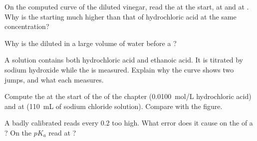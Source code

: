 \begin{exercise}[$\star\star$]\label{exo:g12:ph-conductivity-titrations:10}
On the computed curve of the diluted vinegar, read the  at the start,
at  and at . Why is the starting  much
higher than that of hydrochloric acid at the same concentration?
\end{exercise}

\begin{exercise}[$\star\star$]\label{exo:g12:ph-conductivity-titrations:11}
Why is the  diluted in a large volume of water before a
?
\end{exercise}

\begin{exercise}[$\star\star\star$]\label{exo:g12:ph-conductivity-titrations:12}
A solution contains both hydrochloric acid and ethanoic acid. It is
titrated by sodium hydroxide while the  is measured. Explain why the
curve shows two jumps, and what each  measures.
\end{exercise}

\begin{exercise}[$\star\star\star$]\label{exo:g12:ph-conductivity-titrations:13}
Compute the  at the start of the  of
the chapter (\qty{0.0100}{mol/L} hydrochloric acid) and at 
(\qty{110}{mL} of sodium chloride solution). Compare with the figure.
\end{exercise}

\begin{exercise}[$\star\star\star$]\label{exo:g12:ph-conductivity-titrations:14}
A  badly calibrated reads every  0.2 too high. What error does
it cause on the  of a ? On the $pK_a$
read at ?
\end{exercise}

